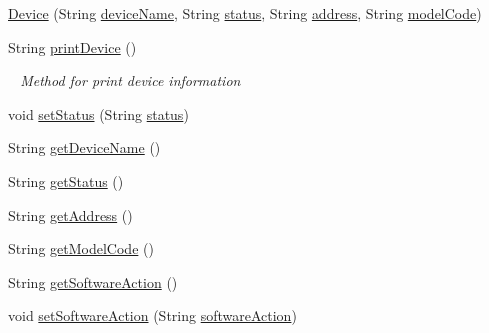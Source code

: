 \begin{DoxyCompactItemize}
\item 
\mbox{\hyperlink{classcom_1_1github_1_1aites_1_1framework_1_1orchestration_1_1_device_a0a208f31f2b1682d8f6c296d748dbb96}{Device}} (String \mbox{\hyperlink{classcom_1_1github_1_1aites_1_1framework_1_1orchestration_1_1_device_aa4746e20c5c8b51170b4ada37295f69e}{device\+Name}}, String \mbox{\hyperlink{classcom_1_1github_1_1aites_1_1framework_1_1orchestration_1_1_device_abe5c31f96d08c3caf2085af43d59cf6f}{status}}, String \mbox{\hyperlink{classcom_1_1github_1_1aites_1_1framework_1_1orchestration_1_1_device_a81329ac5d638ae2e569595efd92a4fe4}{address}}, String \mbox{\hyperlink{classcom_1_1github_1_1aites_1_1framework_1_1orchestration_1_1_device_ad40a301c336d5b74572d497eff8c90eb}{model\+Code}})
\item 
String \mbox{\hyperlink{classcom_1_1github_1_1aites_1_1framework_1_1orchestration_1_1_device_a97282a5052fb7a86da83b10db1958d55}{print\+Device}} ()
\begin{DoxyCompactList}\small\item\em ~\newline
Method for print device information \end{DoxyCompactList}\item 
void \mbox{\hyperlink{classcom_1_1github_1_1aites_1_1framework_1_1orchestration_1_1_device_a6061527628b8f54975f001b4a72de88f}{set\+Status}} (String \mbox{\hyperlink{classcom_1_1github_1_1aites_1_1framework_1_1orchestration_1_1_device_abe5c31f96d08c3caf2085af43d59cf6f}{status}})
\item 
String \mbox{\hyperlink{classcom_1_1github_1_1aites_1_1framework_1_1orchestration_1_1_device_a8ad5140ca72895750560fd3e575c61e0}{get\+Device\+Name}} ()
\item 
String \mbox{\hyperlink{classcom_1_1github_1_1aites_1_1framework_1_1orchestration_1_1_device_ae78046d56adf2d173dae3a2e45164528}{get\+Status}} ()
\item 
String \mbox{\hyperlink{classcom_1_1github_1_1aites_1_1framework_1_1orchestration_1_1_device_a46ef31f43ff94b0e890d8c65238cc5b3}{get\+Address}} ()
\item 
String \mbox{\hyperlink{classcom_1_1github_1_1aites_1_1framework_1_1orchestration_1_1_device_a7ff83e350feda0e74d226235c236d283}{get\+Model\+Code}} ()
\item 
String \mbox{\hyperlink{classcom_1_1github_1_1aites_1_1framework_1_1orchestration_1_1_device_afcca102141c7dedc76bc2a02404c9b67}{get\+Software\+Action}} ()
\item 
void \mbox{\hyperlink{classcom_1_1github_1_1aites_1_1framework_1_1orchestration_1_1_device_a8df054b4a7773e208d0350127bdf8f8c}{set\+Software\+Action}} (String \mbox{\hyperlink{classcom_1_1github_1_1aites_1_1framework_1_1orchestration_1_1_device_a0e90e3fc258c236228d8789722bdf3bb}{software\+Action}})
\end{DoxyCompactItemize}
